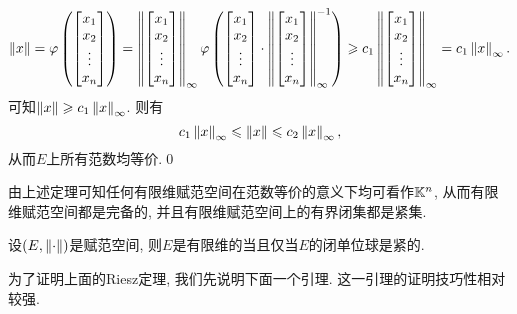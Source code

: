 \begin{Proof}
\[    \left\| x \right\|=\varphi\left(\begin{bmatrix}x_1\\x_2\\\vdots\\x_n\end{bmatrix}\right)=\left\| \begin{bmatrix}x_1\\x_2\\\vdots\\x_n\end{bmatrix} \right\|_\infty\varphi\left(\begin{bmatrix}x_1\\x_2\\\vdots\\x_n\end{bmatrix}\cdot\left\| \begin{bmatrix}x_1\\x_2\\\vdots\\x_n\end{bmatrix} \right\|_\infty^{-1}\right)\geqslant c_1\left\| \begin{bmatrix}x_1\\x_2\\\vdots\\x_n\end{bmatrix} \right\|_\infty=c_1\left\| x \right\|_\infty.
    \]
    可知$ \left\| x \right\|\geqslant c_1\left\| x \right\|_\infty $. 则有
    \[
    c_1\left\| x \right\|_\infty\leqslant\left\| x \right\|\leqslant c_2\left\| x \right\|_\infty,
    \]
    从而$ E $上所有范数均等价.\qed
    \end{Proof}

    \begin{Remark}\label{rmk:有限维赋范空间等价K^n}
    由上述定理可知任何有限维赋范空间在范数等价的意义下均可看作$ \mathbb{K}^n $, 从而有限维赋范空间都是完备的, 并且有限维赋范空间上的有界闭集都是紧集.
    \end{Remark}

    \begin{Theorem}\label{thm:Riesz定理}
    设$ (E,\left\| \cdot \right\|) $是赋范空间, 则$ E $是有限维的当且仅当$ E $的闭单位球是紧的.
    \end{Theorem}

    为了证明上面的Riesz定理, 我们先说明下面一个引理. 这一引理的证明技巧性相对较强.

